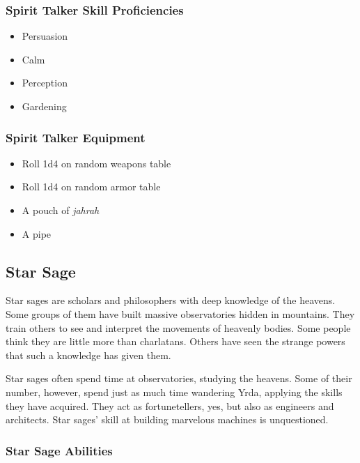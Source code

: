 \begin{multicols}{2}
\subsubsection{Spirit Talker Skill Proficiencies}

\begin{itemize}
  \item Persuasion
  \item Calm
  \item Perception
  \item Gardening
\end{itemize}

\subsubsection{Spirit Talker Equipment}

\begin{itemize}
  \item Roll 1d4 on random weapons table
  \item Roll 1d4 on random armor table
  \item A pouch of \textit{jahrah}
  \item A pipe
\end{itemize}

\subsection{Star Sage}

Star sages are scholars and philosophers with deep knowledge of the heavens.
Some groups of them have built massive observatories hidden in mountains. They
train others to see and interpret the movements of heavenly bodies. Some people
think they are little more than charlatans. Others have seen the strange powers
that such a knowledge has given them.

Star sages often spend time at observatories, studying the heavens. Some of their
number, however, spend just as much time wandering Yrda, applying the skills they
have acquired. They act as fortunetellers, yes, but also as engineers and architects.
Star sages' skill at building marvelous machines is unquestioned.

\subsubsection{Star Sage Abilities}


\end{multicols}
